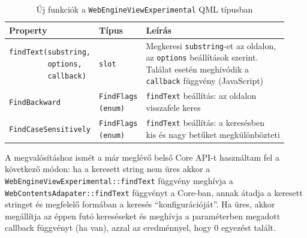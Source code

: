 \documentclass[12pt]{report}
\begin{document}
\begin{table}[ht]
    \centering
    \begin{tabular}[t]{ | l | l | p{188pt} | }
        \hline
        \textbf{Property} & \textbf{Típus} & \textbf{Leírás} \\ \hline

        \makecell[l]{\texttt{findText(substring,} \\
                     \texttt{~~~~~~~~~options,} \\
                     \texttt{~~~~~~~~~callback)}} & \texttt{slot} &
        \makecell[l]{Megkeresi \texttt{substring}-et az oldalon, \\
                     az \texttt{options} beállítások szerint. \\
                     Találat esetén meghívódik a \\
                     \texttt{callback} függvény (JavaScript)}
        \\ \hline

        \texttt{FindBackward} & \makecell[l]{\texttt{FindFlags} \\ \texttt{(enum)}} &
        \makecell[l]{\texttt{findText} beállítás: az oldalon \\
                     visszafele keres}
        \\ \hline

        \texttt{FindCaseSensitively} & \makecell[l]{\texttt{FindFlags} \\ \texttt{(enum)}} &
        \makecell[l]{\texttt{findText} beállítás: a keresésben \\
                     kis és nagy betűket megkülönbözteti}
        \\ \hline
    \end{tabular}
    \caption{
        \label{tab:find-text-api}
        Új funkciók a \texttt{WebEngineViewExperimental} QML típusban
    }
\end{table}

A megvalósításhoz ismét a már meglévő belső Core API-t használtam fel a következő módon:
ha a keresett string nem üres akkor a \texttt{WebEngineViewExperimental::findText} függvény
meghívja a \texttt{WebContentsAdapater::findText} függvényt a Core-ban, annak átadja a
keresett stringet és megfelelő formában a keresés ``konfigurációját''. Ha üres, akkor
megállítja az éppen futó kereséseket és meghívja a paraméterben megadott callback függvényt
(ha van), azzal az eredménnyel, hogy 0 egyezést talált.
\end{document}
